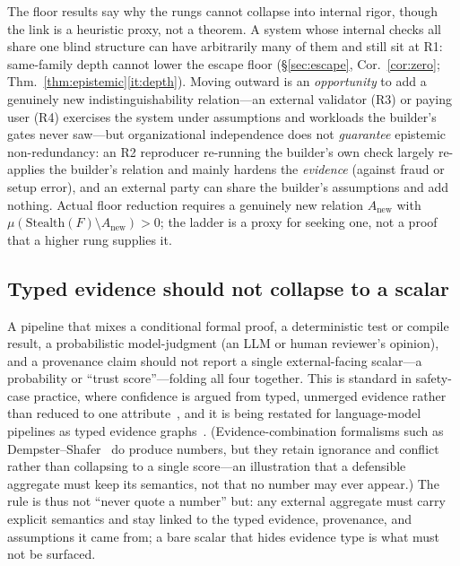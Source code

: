 \documentclass[11pt]{article}
\theoremstyle{definition}
\theoremstyle{remark}
\newcommand{\Stealth}{\mathrm{Stealth}}
\begin{document}
The floor results say why the rungs cannot collapse into internal rigor, though the link is a heuristic
proxy, not a theorem. A system whose internal checks all share one blind structure can have arbitrarily
many of them and still sit at R1: same-family depth cannot lower the escape floor
(\S\ref{sec:escape}, Cor.~\ref{cor:zero}; Thm.~\ref{thm:epistemic}\eqref{it:depth}). Moving outward is
an \emph{opportunity} to add a genuinely new indistinguishability relation---an external validator
(R3) or paying user (R4) exercises the system under assumptions and workloads the builder's gates never
saw---but organizational independence does not \emph{guarantee} epistemic non-redundancy: an R2
reproducer re-running the builder's own check largely re-applies the builder's relation and mainly
hardens the \emph{evidence} (against fraud or setup error), and an external party can share the
builder's assumptions and add nothing. Actual floor reduction requires a genuinely new relation
$A_{\mathrm{new}}$ with $\mu(\Stealth(F)\setminus A_{\mathrm{new}})>0$; the ladder is a proxy for
seeking one, not a proof that a higher rung supplies it.

\subsection{Typed evidence should not collapse to a scalar}
A pipeline that mixes a conditional formal proof, a deterministic test or compile result, a
probabilistic model-judgment (an LLM or human reviewer's opinion), and a provenance claim should not
report a single external-facing scalar---a probability or ``trust score''---folding all four together.
This is standard in safety-case practice, where confidence is argued from typed, unmerged
evidence rather than reduced to one attribute~\cite{gsn,bloomfield2022}, and it is being restated for
language-model pipelines as typed evidence graphs~\cite{wang2026}. (Evidence-combination formalisms
such as Dempster--Shafer~\cite{shafer1976} do produce numbers, but they retain ignorance and conflict
rather than collapsing to a single score---an illustration that a defensible aggregate must keep its
semantics, not that no number may ever appear.) The rule is thus not ``never quote a number'' but:
any external aggregate must carry explicit semantics and stay linked to the typed evidence, provenance,
and assumptions it came from; a bare scalar that hides evidence type is what must not be surfaced.
\end{document}
